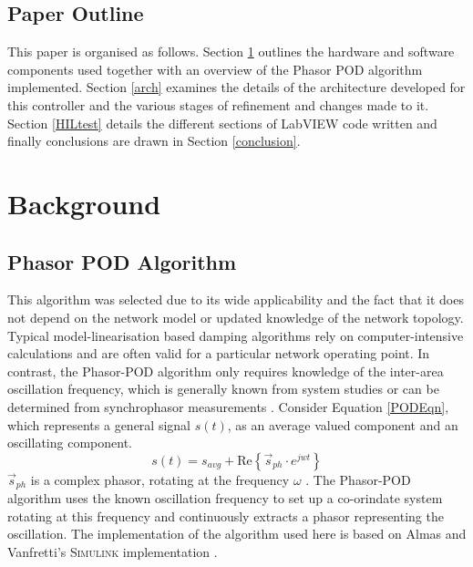\documentclass[conference]{IEEEtran}
\begin{document}
\subsection{Paper Outline}
This paper is organised as follows. Section \ref{background} outlines the hardware and software components used together with an overview of the Phasor POD algorithm implemented. Section \ref{arch} examines the details of the architecture developed for this controller and the various stages of refinement and changes made to it. Section \ref{HILtest} details the different sections of LabVIEW code written and finally conclusions are drawn in Section \ref{conclusion}.

\section{Background}\label{background}

\subsection{Phasor POD Algorithm}
This algorithm\cite{PhasorPOD} was selected due to its wide applicability and the fact that it does not depend on the network model or updated knowledge of the network topology. Typical model-linearisation based damping algorithms rely on computer-intensive calculations and are often valid for a particular network operating point. In contrast, the Phasor-POD algorithm only requires knowledge of the inter-area oscillation frequency, which is generally known from system studies or can be determined from synchrophasor measurements \cite{TaskForce}. Consider Equation \ref{PODEqn}, which represents a general signal $s(t)$, as an average valued component and an oscillating component.
\begin{equation}
s(t)={s}_{avg}+\mathrm{Re}\left\{{\stackrel{\to }{s}}_{ph}\cdot {e}^{{jwt}}\right\}
\label{PODEqn}
\end{equation}
 $\stackrel{\to}{s}_{ph}$ is a complex phasor, rotating at the frequency $\omega$ \cite{PhasorPOD}. The Phasor-POD algorithm uses the known oscillation frequency to set up a co-orindate system rotating at this frequency and continuously extracts a phasor representing the oscillation\cite{PhasorPOD}. The implementation of the algorithm used here is based on Almas and Vanfretti's \textsc{Simulink} implementation \cite{PhasorPODImplement}. %
\end{document}
